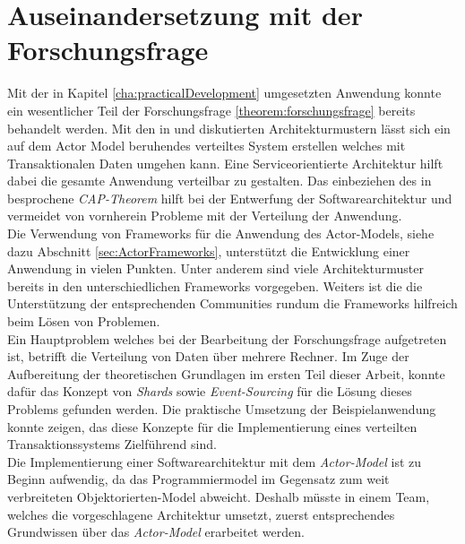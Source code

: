 \section{Auseinandersetzung mit der Forschungsfrage}
Mit der in Kapitel \ref{cha:practicalDevelopment} umgesetzten Anwendung konnte ein wesentlicher Teil der Forschungsfrage \ref{theorem:forschungsfrage} bereits behandelt werden. Mit den in \cite{Vernon2015ReactiveAkka} und \cite{akkaInAction} diskutierten Architekturmustern lässt sich ein auf dem Actor Model beruhendes verteiltes System erstellen welches mit Transaktionalen Daten umgehen kann. Eine Serviceorientierte Architektur hilft dabei die gesamte Anwendung verteilbar zu gestalten. 
Das einbeziehen des in \cite{gilbertPerspectiveCAPTheorem2012} besprochene \textit{CAP-Theorem} hilft bei der Entwerfung der Softwarearchitektur und vermeidet von vornherein Probleme mit der Verteilung der Anwendung. \\
Die Verwendung von Frameworks für die Anwendung des Actor-Models, siehe dazu Abschnitt \ref{sec:ActorFrameworks}, unterstützt die Entwicklung einer Anwendung in vielen Punkten. Unter anderem sind viele Architekturmuster bereits in den unterschiedlichen Frameworks vorgegeben. Weiters ist die die Unterstützung der entsprechenden Communities rundum die Frameworks hilfreich beim Lösen von Problemen. \\
Ein Hauptproblem welches bei der Bearbeitung der Forschungsfrage aufgetreten ist, betrifft die Verteilung von Daten über mehrere Rechner. Im Zuge der Aufbereitung der theoretischen Grundlagen im ersten Teil dieser Arbeit, konnte dafür das Konzept von \textit{Shards} sowie \textit{Event-Sourcing} für die Lösung dieses Problems gefunden werden. Die praktische Umsetzung der Beispielanwendung konnte zeigen, das diese Konzepte für die Implementierung eines verteilten Transaktionssystems Zielführend sind. \\
Die Implementierung einer Softwarearchitektur mit dem \textit{Actor-Model} ist zu Beginn aufwendig, da das Programmiermodel im Gegensatz zum weit verbreiteten Objektorierten-Model abweicht. Deshalb müsste in einem Team, welches die vorgeschlagene Architektur umsetzt, zuerst entsprechendes Grundwissen über das \textit{Actor-Model} erarbeitet werden. \\
% 
% 
% 
% 


